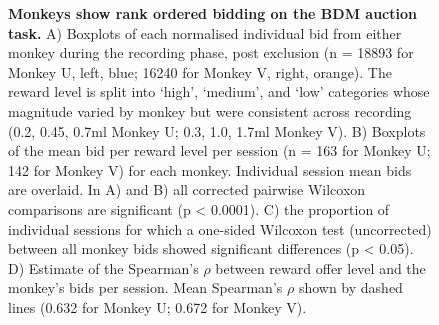 \begin{figure}[htbp!] 
\centering    

\caption[Monkeys show rank ordered bidding on the BDM auction task.]{\textbf{Monkeys show rank ordered bidding on the BDM auction task.} A) Boxplots of each normalised individual bid from either monkey during the recording phase, post exclusion (n = 18893 for Monkey U, left, blue; 16240 for Monkey V, right, orange). The reward level is split into ‘high’, ‘medium’, and ‘low’ categories whose magnitude varied by monkey but were consistent across recording (0.2, 0.45, 0.7ml Monkey U; 0.3, 1.0, 1.7ml Monkey V). B) Boxplots of the mean bid per reward level per session (n = 163 for Monkey U; 142 for Monkey V) for each monkey. Individual session mean bids are overlaid. In A) and B) all corrected pairwise Wilcoxon comparisons are significant (p < 0.0001). C) the proportion of individual sessions for which a one-sided Wilcoxon test (uncorrected) between all monkey bids showed significant differences (p < 0.05). D) Estimate of the Spearman’s $\rho$ between reward offer level and the monkey’s bids per session. Mean Spearman’s $\rho$ shown by dashed lines (0.632 for Monkey U; 0.672 for Monkey V).}
\label{fig:monkey_bid_correlation}
\end{figure}

